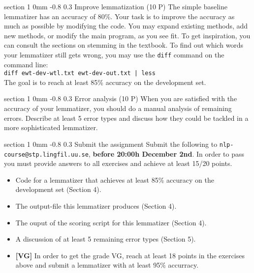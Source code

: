 \documentclass[11pt]{article}
\makeatletter
\newcommand{\newsec}[2]{\section{#1}\label{sec:#2}\noindent}
\renewcommand{\section}{\@startsection
{section}%
{1}%
{0mm}%
{-0.8\baselineskip}%
{0.3\baselineskip}%
{\bfseries\large}}%
\makeatother
\begin{document}
\newsec{Improve lemmatization (10 P)}{improve}%
The simple baseline lemmatizer has an accuracy of 80\%. Your task is to improve the accuracy as much as possible by modifying the code. You may expand existing methods,
add new methods, or modify the main program, as you see fit. To get inspiration, you can consult the sections on stemming in the textbook. To find out which words your lemmatizer still gets wrong, you may use the \texttt{diff} command on the command line:\\

\noindent
\texttt{diff ewt-dev-wtl.txt ewt-dev-out.txt | less}\\

\noindent
The goal is to reach at least 85\% accuracy on the development set.

\newsec{Error analysis (10 P)}{error}%
When you are satisfied with the accuracy of your lemmatizer, you should do a manual analysis of remaining errors. Describe at least 5 error types and discuss how they 
could be tackled in a more sophisticated lemmatizer.

\newsec{Submit the assignment}{submit}%
Submit the following to {\tt nlp-course@stp.lingfil.uu.se}, \textbf{before 20:00h December 2nd}. In order to pass you must provide answers to all exercises and achieve at least 15/20 points.
\begin{itemize}[noitemsep,topsep=0.2cm]
\item Code for a lemmatizer that achieves at least 85\% accuracy on the development set (Section 4).
\item The output-file this lemmatizer produces (Section 4).
\item The ouput of the scoring script for this lemmatizer (Section 4).
\item A discussion of at least 5 remaining error types (Section 5).
\item \textbf{[VG]} In order to get the grade VG, reach at least 18 points in the exercises above and submit a lemmatizer with at least 95\% accurracy.
\end{itemize}
\end{document}
